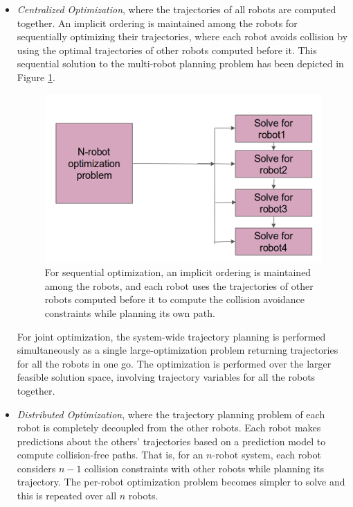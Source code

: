 \begin{itemize}
    \item \textit{Centralized Optimization}, where the trajectories of all robots are computed together. An implicit ordering is maintained among the robots for sequentially optimizing their trajectories, where each robot avoids collision by using the optimal trajectories of other robots computed before it. This sequential solution to the multi-robot planning problem has been depicted in Figure \ref{fig:intro_sequential_optimization}.

    \begin{figure}
    \centering
    \includegraphics[scale=0.5]{figures/intro/sequential-planning-pipeline.png}
    \caption[Sequential Planning Pipeline for Multi-Robot Systems]{For sequential optimization, an implicit ordering is maintained among the robots, and each robot uses the trajectories of other robots computed before it to compute the collision avoidance constraints while planning its own path. }
    \label{fig:intro_sequential_optimization}
\end{figure}

    For joint optimization, the system-wide trajectory planning is performed simultaneously as a single large-optimization problem returning trajectories for all the robots in one go. The optimization is performed over the larger feasible solution space, involving trajectory variables for all the robots together. 
    \item \textit{Distributed Optimization}, where the trajectory planning problem of each robot is completely decoupled from the other robots. Each robot makes predictions about the others' trajectories based on a prediction model to compute collision-free paths. That is, for an $n$-robot system, each robot considers $n-1$ collision constraints with other robots while planning its trajectory. The per-robot optimization problem becomes simpler to solve and this is repeated over all $n$ robots.
\end{itemize}

